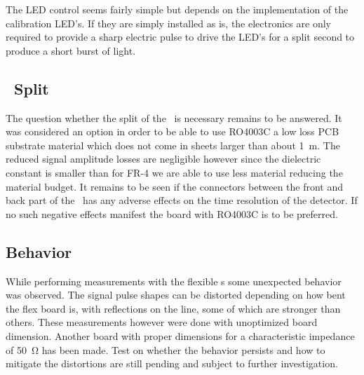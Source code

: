 \documentclass[../BTOF_summary.tex]{subfiles}
\begin{document}
The LED control seems fairly simple but depends on the implementation of the calibration LED's.
If they are simply installed as is, the electronics are only required to provide a sharp electric pulse to drive the LED's for a split second to produce a short burst of light.

\subsection[]{\railboard\ Split}

The question whether the split of the \railboard\ is necessary remains to be answered.
It was considered an option in order to be able to use RO4003C a low loss PCB substrate material which does not come in sheets larger than about \SI{1}{m}.
The reduced signal amplitude losses are negligible however since the dielectric constant is smaller than for FR-4 we are able to use less material reducing the material budget.
It remains to be seen if the connectors between the front and back part of the \railboard\ has any adverse effects on the time resolution of the detector.
If no such negative effects manifest the board with RO4003C is to be preferred.

\subsection{\sensorboard Behavior}

While performing measurements with the flexible \sensorboard s some unexpected behavior was observed.
The signal pulse shapes can be distorted depending on how bent the flex board is, with reflections on the line, some of which are stronger than others.
These measurements however were done with unoptimized board dimension.
Another board with proper dimensions for a characteristic impedance of \SI{50}{\ohm} has been made. 
Test on whether the behavior persists and how to mitigate the distortions are still pending and subject to further investigation.
\end{document}
